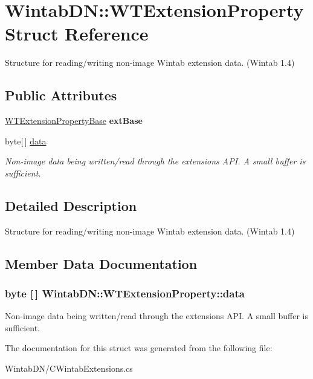 \hypertarget{struct_wintab_d_n_1_1_w_t_extension_property}{
\section{WintabDN::WTExtensionProperty Struct Reference}
\label{struct_wintab_d_n_1_1_w_t_extension_property}
}


Structure for reading/writing non-\/image Wintab extension data. (Wintab 1.4)  


\subsection*{Public Attributes}
\begin{DoxyCompactItemize}
\item 
\hypertarget{struct_wintab_d_n_1_1_w_t_extension_property_ac179deb6ab648adbfd9836f7573dd4e7}{
\hyperlink{struct_wintab_d_n_1_1_w_t_extension_property_base}{WTExtensionPropertyBase} {\bfseries extBase}}
\label{struct_wintab_d_n_1_1_w_t_extension_property_ac179deb6ab648adbfd9836f7573dd4e7}

\item 
byte\mbox{[}$\,$\mbox{]} \hyperlink{struct_wintab_d_n_1_1_w_t_extension_property_a020f8bb353cc6eeb111407e350941ec1}{data}
\begin{DoxyCompactList}\small\item\em Non-\/image data being written/read through the extensions API. A small buffer is sufficient. \item\end{DoxyCompactList}\end{DoxyCompactItemize}


\subsection{Detailed Description}
Structure for reading/writing non-\/image Wintab extension data. (Wintab 1.4) 

\subsection{Member Data Documentation}
\hypertarget{struct_wintab_d_n_1_1_w_t_extension_property_a020f8bb353cc6eeb111407e350941ec1}{
\subsubsection[{data}]{\setlength{\rightskip}{0pt plus 5cm}byte \mbox{[}$\,$\mbox{]} {\bf WintabDN::WTExtensionProperty::data}}}
\label{struct_wintab_d_n_1_1_w_t_extension_property_a020f8bb353cc6eeb111407e350941ec1}


Non-\/image data being written/read through the extensions API. A small buffer is sufficient. 



The documentation for this struct was generated from the following file:\begin{DoxyCompactItemize}
\item 
WintabDN/CWintabExtensions.cs\end{DoxyCompactItemize}
